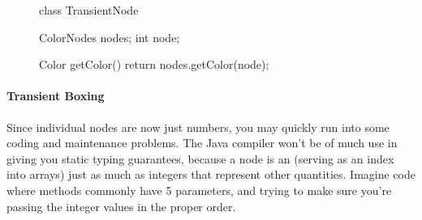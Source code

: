 





\begin{figure}
\centering
\vspace{-3mm}
\begin{framedlisting}
class TransientNode {
  ColorNodes nodes;
  int node;
  
  Color getColor() {
    return nodes.getColor(node);
  }
}
\end{framedlisting}
\end{figure}
\paragraph{Transient Boxing}
Since individual nodes are now just numbers, you may quickly run into some
coding and maintenance problems. The Java compiler won't be of much use in
giving you static typing guarantees, because a node is an 
(serving as an index into arrays) just as much as integers that represent
other quantities. Imagine code where methods commonly have 5
 parameters, and trying to make sure you're passing the integer
values in the proper order.

